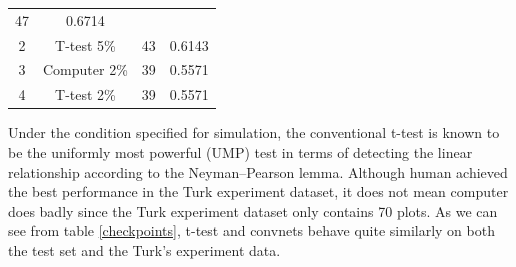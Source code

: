 \documentclass[12pt]{article}
\begin{document}
\begin{longtable}[]{@{}cccc@{}}
\begin{minipage}[t]{0.21\columnwidth}
47\strut
\end{minipage} & \begin{minipage}[t]{0.12\columnwidth}\centering\strut
0.6714\strut
\end{minipage}\tabularnewline
\begin{minipage}[t]{0.09\columnwidth}\centering\strut
2\strut
\end{minipage} & \begin{minipage}[t]{0.17\columnwidth}\centering\strut
T-test 5\%\strut
\end{minipage} & \begin{minipage}[t]{0.21\columnwidth}\centering\strut
43\strut
\end{minipage} & \begin{minipage}[t]{0.12\columnwidth}\centering\strut
0.6143\strut
\end{minipage}\tabularnewline
\begin{minipage}[t]{0.09\columnwidth}\centering\strut
3\strut
\end{minipage} & \begin{minipage}[t]{0.17\columnwidth}\centering\strut
Computer 2\%\strut
\end{minipage} & \begin{minipage}[t]{0.21\columnwidth}\centering\strut
39\strut
\end{minipage} & \begin{minipage}[t]{0.12\columnwidth}\centering\strut
0.5571\strut
\end{minipage}\tabularnewline
\begin{minipage}[t]{0.09\columnwidth}\centering\strut
4\strut
\end{minipage} & \begin{minipage}[t]{0.17\columnwidth}\centering\strut
T-test 2\%\strut
\end{minipage} & \begin{minipage}[t]{0.21\columnwidth}\centering\strut
39\strut
\end{minipage} & \begin{minipage}[t]{0.12\columnwidth}\centering\strut
0.5571\strut
\end{minipage}\tabularnewline
\bottomrule
\end{longtable}

Under the condition specified for simulation, the conventional t-test is
known to be the uniformly most powerful (UMP) test in terms of detecting
the linear relationship according to the Neyman--Pearson lemma.
\citep{Neyman289} Although human achieved the best performance in the
Turk experiment dataset, it does not mean computer does badly since the
Turk experiment dataset only contains 70 plots. As we can see from table
\ref{checkpoints}, t-test and convnets behave quite similarly on both
the test set and the Turk's experiment data.
\end{document}
